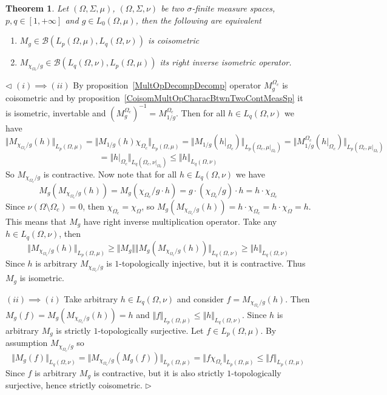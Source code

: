 \documentclass[12pt]{article}
\newtheorem{theorem}{Theorem}[subsection]
\newenvironment{proof}{\par $\triangleleft$}{$\triangleright$}
\begin{document}
\begin{theorem}\label{CoisomMultOpDescBtwnTwoMeasSp}
    Let $(\Omega,\Sigma,\mu)$, $(\Omega,\Sigma,\nu)$ be two $\sigma$-finite
    measure spaces, $p,q\in[1,+\infty]$ and $g\in L_0(\Omega,\mu)$, then the
    following are equivalent
    \begin{enumerate}[label = (\roman*)]
        \item $M_g\in\mathcal{B}(L_p(\Omega,\mu),L_q(\Omega,\nu))$ is
              coisometric

        \item $M_{\chi_{\Omega_c}/g}
                  \in\mathcal{B}(L_q(\Omega,\nu), L_p(\Omega,\mu))$ 
              its right inverse isometric operator.
    \end{enumerate}
\end{theorem}
\begin{proof}
    $(i)\implies (ii)$ By proposition~\ref{MultOpDecompDecomp} operator
    $M_g^{\Omega_c}$ is coisometric and by
    proposition~\ref{CoisomMultOpCharacBtwnTwoContMeasSp} it is isometric,
    invertable and ${(M_g^{\Omega_c})}^{-1}=M_{1/g}^{\Omega_c}$. Then for
    all $h\in L_q(\Omega,\nu)$ we have
    $$
        \Vert M_{\chi_{\Omega_c}/g}(h)\Vert_{L_p(\Omega,\mu)}= \Vert
        M_{1/g}(h)\chi_{\Omega_c}\Vert_{L_p(\Omega,\mu)}= \Vert
        M_{1/g}(h|_{\Omega_c})\Vert_{L_p(\Omega_c,\mu|_{\Omega_c})}= \Vert
        M_{1/g}^{\Omega_c}(h|_{\Omega_c})\Vert_{L_p(\Omega_c,\mu|_{\Omega_c})}
    $$
    $$
        =\Vert h|_{\Omega_c}\Vert_{L_q(\Omega_c,\nu|_{\Omega_c})} \leq\Vert
        h\Vert_{L_q(\Omega,\nu)}
    $$
    So $M_{\chi_{\Omega_c}/g}$ is contractive. Now note that for all
    $h\in L_q(\Omega,\nu)$ we have
    $$
        M_g(M_{\chi_{\Omega_c}/g}(h)) =M_g(\chi_{\Omega_c}/g\cdot h)
        =g\cdot(\chi_{\Omega_c}/g)\cdot  h =h\cdot\chi_{\Omega_c}
    $$
    Since $\nu(\Omega\setminus\Omega_c)=0$, then
    $\chi_{\Omega_c}=\chi_{\Omega}$, so
    $M_g(M_{\chi_{\Omega_c}/g}(h))=h\cdot\chi_{\Omega_c}=h\cdot\chi_{\Omega}=h$.
    This means that $M_g$ have right inverse multiplication operator. Take any
    $h\in L_q(\Omega,\nu)$, then
    $$
        \Vert M_{\chi_{\Omega_c}/g}(h)\Vert_{L_p(\Omega,\mu)} \geq\Vert
        M_g\Vert\Vert M_g(M_{\chi_{\Omega_c}/g}(h))\Vert_{L_q(\Omega,\nu)}
        \geq\Vert h\Vert_{L_q(\Omega,\nu)}
    $$
    Since $h$ is arbitrary $M_{\chi_{\Omega_c}/g}$ is $1$-topologically
    injective, but it is contractive. Thus $M_g$ is isometric.

    $(ii)\implies (i)$ Take arbitrary $h\in L_q(\Omega,\nu)$ and
    consider $f=M_{\chi_{\Omega_c}/g}(h)$. Then
    $M_g(f)=M_g(M_{\chi_{\Omega_c}/g}(h))=h$ and
    $\Vert f\Vert_{L_p(\Omega,\mu)}\leq\Vert h\Vert_{L_q(\Omega,\nu)}$. Since
    $h$ is arbitrary $M_g$ is strictly $1$-topologically surjective. Let
    $f\in L_p(\Omega,\mu)$. By assumption $M_{\chi_{\Omega_c}/g}$ so
    $$
        \Vert M_g(f)\Vert_{L_q(\Omega,\nu)} =\Vert
        M_{\chi_{\Omega_c}/g}(M_g(f))\Vert_{L_p(\Omega,\mu)} =\Vert
        f\chi_{\Omega_c}\Vert_{L_p(\Omega,\mu)} \leq\Vert
        f\Vert_{L_p(\Omega,\mu)}
    $$
    Since $f$ is arbitrary $M_g$ is contractive, but it is also strictly
    $1$-topologically surjective, hence strictly coisometric.
\end{proof}
\end{document}
